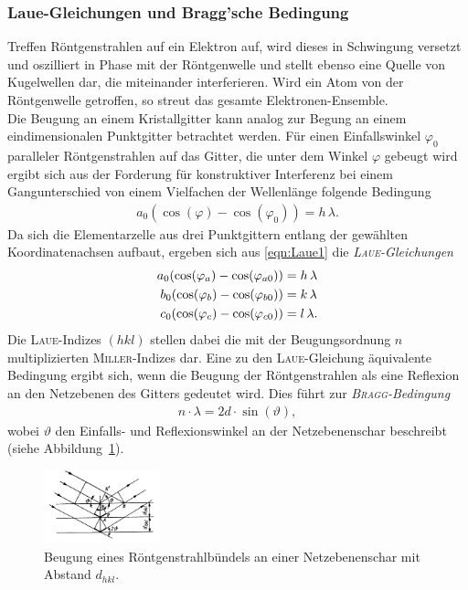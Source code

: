 \documentclass[a4paper,twoside,final]{article}
\begin{document}
\subsubsection{Laue-Gleichungen und Bragg'sche Bedingung}
Treffen Röntgenstrahlen auf ein Elektron auf, wird dieses in Schwingung versetzt und oszilliert in Phase mit der Röntgenwelle und stellt ebenso eine Quelle von Kugelwellen dar, die miteinander interferieren. Wird ein Atom von der Röntgenwelle getroffen, so streut das gesamte Elektronen-Ensemble.\\
Die Beugung an einem Kristallgitter kann analog zur Begung an einem eindimensionalen Punktgitter betrachtet werden. Für einen Einfallswinkel $\varphi_0$ paralleler Röntgenstrahlen auf das Gitter, die unter dem Winkel $\varphi$ gebeugt wird ergibt sich aus der Forderung für konstruktiver Interferenz bei einem Gangunterschied von einem Vielfachen der Wellenlänge folgende Bedingung
\begin{align}
  a_0 (\cos(\varphi) - \cos(\varphi_0)) = h\,\lambda.\label{eqn:Laue1}
\end{align}
Da sich die Elementarzelle aus drei Punktgittern entlang der gewählten Koordinatenachsen aufbaut, ergeben sich aus \eqref{eqn:Laue1} die \textit{\textsc{Laue}-Gleichungen}
\begin{align}\label{eqn:Laue2}
  a_0 (\cos(\varphi_a) - \cos(\varphi_{a0})) &= h\,\lambda\notag\\
  b_0 (\cos(\varphi_b) - \cos(\varphi_{b0})) &= k\,\lambda\\
  c_0 (\cos(\varphi_c) - \cos(\varphi_{c0})) &= l\,\lambda\notag.
\end{align}
Die \textsc{Laue}-Indizes $(hkl)$ stellen dabei die mit der Beugungsordnung $n$ multiplizierten \textsc{Miller}-Indizes dar.
Eine zu den \textsc{Laue}-Gleichung äquivalente Bedingung ergibt sich, wenn die Beugung der Röntgenstrahlen als eine Reflexion an den Netzebenen des Gitters gedeutet wird.  Dies führt zur \textit{\textsc{Bragg}-Bedingung}
\begin{align}
  n\cdot \lambda = 2d\cdot \sin(\vartheta)\label{eqn:Bragg},
\end{align}
wobei $\vartheta$ den Einfalls- und Reflexionswinkel an der Netzebenenschar beschreibt (siehe Abbildung~\ref{fig:Roentgenbeugung}).
\begin{figure}[htp]
    \centering
    \includegraphics[width=0.3\textwidth]{Abbildungen/Roentgenbeugung.pdf}
    \caption{Beugung eines Röntgenstrahlbündels an einer Netzebenenschar mit Abstand $d_{hkl}$.~\cite[S.367]{Kleber}}
    \label{fig:Roentgenbeugung}
\end{figure}\\
\end{document}
